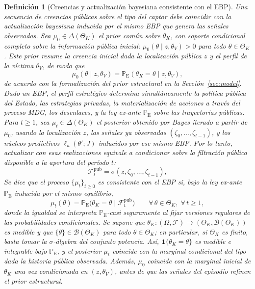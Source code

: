\documentclass[pdflatex,sn-mathphys-ay]{sn-jnl}
\theoremstyle{thmstyleone}
\theoremstyle{thmstyletwo}
\theoremstyle{thmstylethree}
\newtheorem{definition}{Definición}
\newcommand{\ProbE}{\mathbb{P}_{\mathrm{E}}}
\newcommand{\ThetaK}{\Theta_K}
\newcommand{\1}{\mathbf{1}}
\begin{document}
\begin{definition}[Creencias y actualización bayesiana consistente con el EBP]\label{def:beliefs-martingale}
Una secuencia de creencias públicas sobre el tipo del captor debe coincidir con la actualización bayesiana inducida por el mismo EBP que genera las señales observadas. Sea $\mu_0\in\Delta(\ThetaK)$ el prior común sobre $\theta_K$, con soporte condicional completo sobre la información pública inicial: $\mu_0(\theta \mid z,\theta_V)>0$ para todo $\theta\in\ThetaK$. Este prior resume la creencia inicial dada la localización pública $z$ y el perfil de la víctima $\theta_V$, de modo que
\[
\mu_0(\theta \mid z,\theta_V)=\ProbE(\theta_K=\theta\mid z,\theta_V),
\]
de acuerdo con la formalización del prior estructural en la Sección~\ref{sec:model}. Dado un EBP, el perfil estratégico determina simultáneamente la política pública del Estado, las estrategias privadas, la materialización de acciones a través del proceso MDG, los desenlaces, y la ley ex-ante $\ProbE$ sobre las trayectorias públicas. Para $t\ge 1$, sea $\mu_t\in\Delta(\ThetaK)$ el posterior obtenido por Bayes iterado a partir de $\mu_0$, usando la localización $z$, las señales ya observadas $(\zeta_0,\ldots,\zeta_{t-1})$, y los núcleos predictivos $\ell_u(\theta';J)$ inducidos por ese mismo EBP. Por lo tanto, actualizar con esas realizaciones equivale a condicionar sobre la filtración pública disponible a la apertura del período $t$:
\[
\mathcal{F}_t^{\mathrm{pub}}=\sigma(z,\zeta_0,\ldots,\zeta_{t-1}),
\]
Se dice que el proceso $\{\mu_t\}_{t\ge 0}$ es consistente con el EBP si, bajo la ley ex-ante $\ProbE$ inducida por el mismo equilibrio,
\begin{equation}
\label{eq:beliefs-ebp-consistency}
\mu_t(\theta)=\ProbE\bigl(\theta_K=\theta\mid\mathcal{F}_t^{\mathrm{pub}}\bigr)\qquad \forall\,\theta\in\ThetaK,\;\forall\,t\ge 1,
\end{equation}
donde la igualdad se interpreta $\ProbE$-casi seguramente al fijar versiones regulares de las probabilidades condicionales. Se supone que $\theta_K:(\Omega,\mathcal{F})\to(\ThetaK,\mathcal{B}(\ThetaK))$ es medible y que $\{\theta\}\in\mathcal{B}(\ThetaK)$ para todo $\theta\in\ThetaK$; en particular, si $\ThetaK$ es finito, basta tomar la $\sigma$-álgebra del conjunto potencia. Así, $\mathbf{1}\{\theta_K=\theta\}$ es medible e integrable bajo $\ProbE$, y el posterior $\mu_t$ coincide con la marginal condicional del tipo dada la historia pública observada. Además, $\mu_0$ coincide con la marginal inicial de $\theta_K$ una vez condicionada en $(z, \theta_V)$, antes de que las señales del episodio refinen el prior estructural.
\end{definition}
\end{document}
